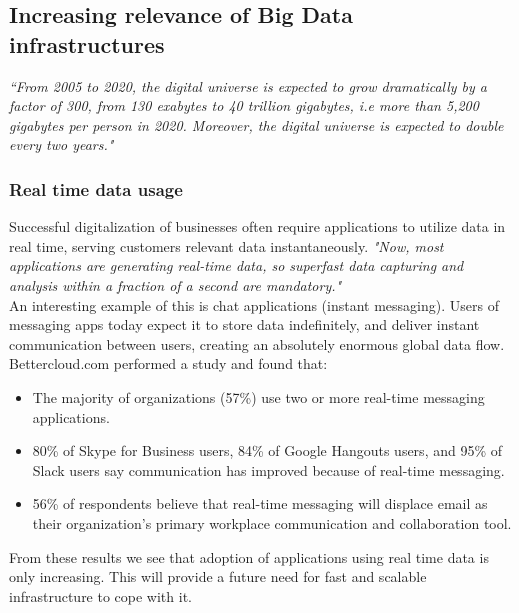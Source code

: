 \documentclass[a4paper,english]{report}
\begin{document}
			\subsection{Increasing relevance of Big Data infrastructures}
			\label{big_data}
			\textit{``From 2005 to 2020, the digital universe is expected to grow dramatically by a factor of 300, from 130 exabytes to 40 trillion gigabytes, i.e more than 5,200 gigabytes per person in 2020. Moreover, the digital universe is expected to double every two years."}\cite{bigdata}
				\subsubsection{Real time data usage}
				Successful digitalization of businesses often require applications to utilize data in real time, serving customers relevant data instantaneously. \textit{"Now, most applications are generating real-time data, so superfast data capturing and analysis within a fraction of a second are mandatory."}\cite{management_analytics}
				\\
				An interesting example of this is chat applications (instant messaging). Users of messaging apps today expect it to store data indefinitely, and deliver instant communication between users, creating an absolutely enormous global data flow. Bettercloud.com performed a study and found that\cite{bettercloud}:
				\begin{itemize}
					\item The majority of organizations (57\%) use two or more real-time messaging applications.
					\item 80\% of Skype for Business users, 84\% of Google Hangouts users, and 95\% of Slack users say communication has improved because of real-time messaging.
					\item 56\% of respondents believe that real-time messaging will displace email as their organization’s primary workplace communication and collaboration tool.
				\end{itemize}
				From these results we see that adoption of applications using real time data is only increasing. This will provide a future need for fast and scalable infrastructure to cope with it. 
\end{document}
